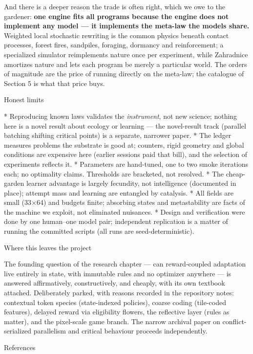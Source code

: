 And there is a deeper reason the trade is often right, which we owe
to the gardener: {\bf one engine fits all programs because the
engine does not implement any model --- it implements the meta-law
the models share.} Weighted local stochastic rewriting is the
common physics beneath contact processes, forest fires, sandpiles,
foraging, dormancy and reinforcement; a specialized simulator
reimplements nature once per experiment, while Zahradnice amortizes
nature and lets each program be merely a particular world. The
orders of magnitude are the price of running directly on the
meta-law; the catalogue of Section 5 is what that price buys.

\sec Honest limits

\begitems
* Reproducing known laws validates the {\it instrument}, not new
science; nothing here is a novel result about ecology or learning
--- the novel-result track (parallel batching shifting critical
points) is a separate, narrower paper.
* The ledger measures problems the substrate is good at; counters,
rigid geometry and global conditions are expensive here (earlier
sessions paid that bill), and the selection of experiments reflects
it.
* Parameters are hand-tuned, one to two smoke iterations each; no
optimality claims. Thresholds are bracketed, not resolved.
* The cheap-garden learner advantage is largely fecundity, not
intelligence (documented in place); attempt mass and learning are
entangled by catalysis.
* All fields are small (33$\times$64) and budgets finite; absorbing
states and metastability are facts of the machine we exploit,
not eliminated nuisances.
* Design and verification were done by one human--one model pair;
independent replication is a matter of running the committed
scripts (all runs are seed-deterministic).
\enditems

\sec Where this leaves the project

The founding question of the research chapter --- can reward-coupled
adaptation live entirely in state, with immutable rules and no
optimizer anywhere --- is answered affirmatively, constructively,
and cheaply, with its own textbook attached. Deliberately parked,
with reasons recorded in the repository notes: contextual token
species (state-indexed policies), coarse coding (tile-coded
features), delayed reward via eligibility flowers, the reflective
layer (rules as matter), and the pixel-scale game branch. The
narrow archival paper on conflict-serialized parallelism and
critical behaviour proceeds independently.

\sec References


